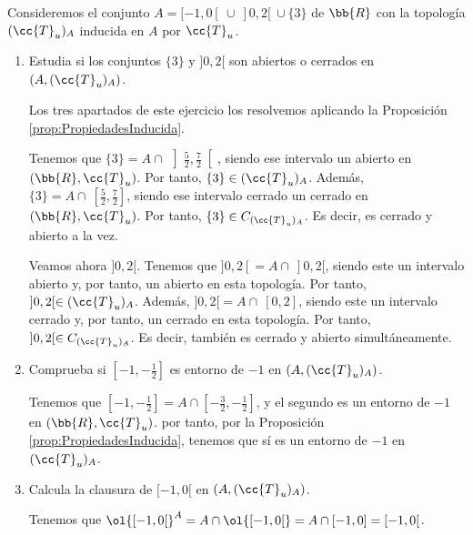 \begin{ejercicio}
    Consideremos el conjunto $A=[-1, 0[~\cup~ ]0,2[~\cup \{3\}$ de $\bb{R}$ con la topología $(\cc{T}_u)_A$ inducida en $A$ por $\cc{T}_u$.
    \begin{enumerate}
        \item Estudia si los conjuntos $\{3\}$ y $]0,2[$ son abiertos o cerrados en $(A, (\cc{T}_u)_A)$.

        Los tres apartados de este ejercicio los resolvemos aplicando la Proposición \ref{prop:PropiedadesInducida}.

        Tenemos que $\{3\}=A\cap~\left]\frac{5}{2}, \frac{7}{2}\right[$, siendo ese intervalo un abierto en $(\bb{R},\cc{T}_u)$. Por tanto, $\{3\}\in (\cc{T}_u)_A$. Además, $\{3\}=A\cap~\left[\frac{5}{2}, \frac{7}{2}\right]$, siendo ese intervalo cerrado un cerrado en $(\bb{R},\cc{T}_u)$. Por tanto, $\{3\}\in C_{(\cc{T}_u)_A}$. Es decir, es cerrado y abierto a la vez.
    
        Veamos ahora $]0,2[$. Tenemos que $]0,2[=A\cap~ ]0,2[$, siendo este un intervalo abierto y, por tanto, un abierto en esta topología. Por tanto, $]0,2[\in (\cc{T}_u)_A$. Además, $]0,2[=A\cap~ [0,2]$, siendo este un intervalo cerrado y, por tanto, un cerrado en esta topología. Por tanto, $]0,2[\in C_{(\cc{T}_u)_A}$.  Es decir, también es cerrado y abierto simultáneamente.
        
        \item Comprueba si $\left[-1,-\frac{1}{2}\right]$ es entorno de $-1$ en $(A,(\cc{T}_u)_A)$.

        Tenemos que $\left[-1,-\frac{1}{2}\right]=A\cap \left[-\frac{3}{2},-\frac{1}{2}\right]$, y el segundo es un entorno de $-1$ en $(\bb{R},\cc{T}_u)$. por tanto, por la Proposición \ref{prop:PropiedadesInducida}, tenemos que sí es un entorno de $-1$ en $(\cc{T}_u)_A$.

        
        \item Calcula la clausura de $[-1, 0[$ en $(A,(\cc{T}_u)_A)$.

        Tenemos que $\ol{[-1, 0[}^A = A\cap \ol{[-1, 0[} = A\cap [-1,0]=[-1,0[$.
    \end{enumerate}
\end{ejercicio}

